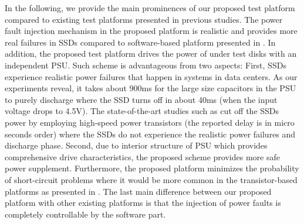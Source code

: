 In the following, we provide the main prominences of our proposed test platform compared to existing test platforms presented in previous studies. The power fault injection mechanism in the proposed platform is realistic and provides more real failures in SSDs compared to software-based platform presented in \cite{kim2007virtual}. In addition, the proposed test platform drives the power of under test disks with an independent PSU. Such scheme is advantageous from two aspects: First, SSDs experience realistic power failures that happen in systems in data centers. As our experiments reveal, it takes about 900ms for the large size capacitors in the PSU to purely discharge where the SSD turns off in about 40ms (when the input voltage drops to 4.5V).  The state-of-the-art studies such as \cite{tseng2011understanding, zheng2013understanding} cut off the SSDs power by employing high-speed power transistors (the reported delay is in micro seconds order) where the SSDs do not experience the realistic power failures and discharge phase. Second, due to  interior structure of PSU which provides comprehensive drive characteristics, the proposed scheme provides more safe power supplement.
Furthermore, the proposed platform minimizes the probability of short-circuit problems where it would be more common in the transistor-based platforms as presented in \cite{tseng2011understanding, zheng2013understanding}. The last main difference between our proposed platform with other existing platforms is that the injection of power faults is completely controllable by the software part.


